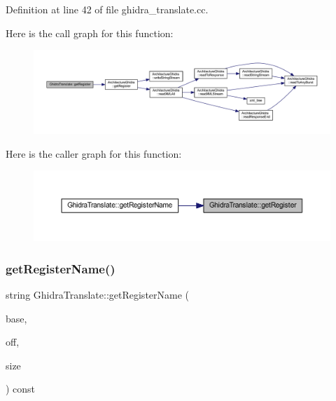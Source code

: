 Definition at line 42 of file ghidra\+\_\+translate.\+cc.

Here is the call graph for this function\+:
\nopagebreak
\begin{figure}[H]
\begin{center}
\leavevmode
\includegraphics[width=350pt]{class_ghidra_translate_a81e1af3292005903279e80a61a6ccfac_cgraph}
\end{center}
\end{figure}
Here is the caller graph for this function\+:
\nopagebreak
\begin{figure}[H]
\begin{center}
\leavevmode
\includegraphics[width=350pt]{class_ghidra_translate_a81e1af3292005903279e80a61a6ccfac_icgraph}
\end{center}
\end{figure}
\mbox{\label{class_ghidra_translate_a62652735dff5298e4c8bae0872d7e7cb}} 
\subsubsection{\texorpdfstring{getRegisterName()}{getRegisterName()}}
{\footnotesize\ttfamily string Ghidra\+Translate\+::get\+Register\+Name (\begin{DoxyParamCaption}\item[{\mbox{\hyperlink{class_addr_space}{Addr\+Space}} $\ast$}]{base,  }\item[{\mbox{\hyperlink{types_8h_a2db313c5d32a12b01d26ac9b3bca178f}{uintb}}}]{off,  }\item[{int4}]{size }\end{DoxyParamCaption}) const\hspace{0.3cm}{\ttfamily [virtual]}}



